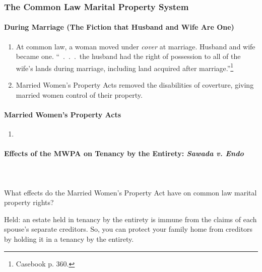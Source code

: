 \subsubsection{The Common Law Marital Property System}

\paragraph{During Marriage (The Fiction that Husband and Wife Are One)}

\begin{enumerate}
    \item At common law, a woman moved under \emph{cover} at marriage. Husband 
    and wife became one. ``~.~.~.~the husband had the right of possession to 
    all of the wife's lands during marriage, including land acquired after 
    marriage.''\footnote{Casebook p. 360.}
    \item Married Women's Property Acts removed the disabilities of coverture, 
    giving married women control of their property.
\end{enumerate}


\paragraph{Married Women's Property Acts}

\begin{enumerate}
    \item %
\end{enumerate}

\paragraph{Effects of the MWPA on Tenancy by the Entirety: \emph{Sawada v. Endo}}
~\\\\
What effects do the Married Women's Property Act have on common law marital 
property rights?

Held: an estate held in tenancy by the entirety is immune from the claims of 
each spouse's separate creditors. So, you can protect your family home from 
creditors by holding it in a tenancy by the entirety.


